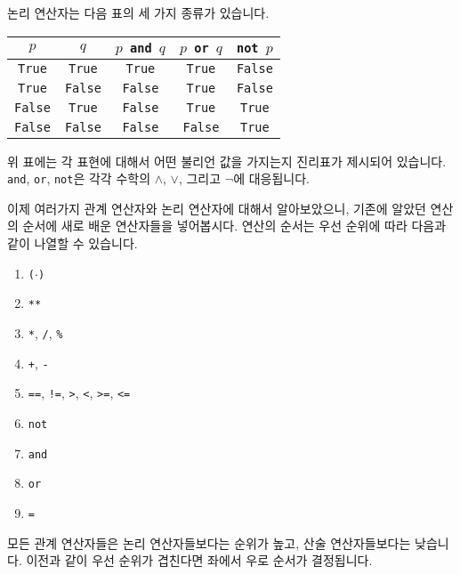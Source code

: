 \documentclass[../main.tex]{subfiles}
\begin{document}
논리 연산자는 다음 표의 세 가지 종류가 있습니다.
\begin{table}[H]
  \centering
  \begin{tabular}{c|c|c|c|c}
    $p$ & $q$ & \texttt{$p$ and $q$} & \texttt{$p$ or $q$} & \texttt{not $p$}\\ \hline
    \texttt{True} & \texttt{True} & \texttt{True} & \texttt{True} & \texttt{False}          \\
    \texttt{True} & \texttt{False} & \texttt{False} & \texttt{True} & \texttt{False}          \\
    \texttt{False} & \texttt{True} & \texttt{False} & \texttt{True} & \texttt{True}          \\
    \texttt{False} & \texttt{False} & \texttt{False} & \texttt{False} & \texttt{True}
  \end{tabular}
\end{table}
위 표에는 각 표현에 대해서 어떤 불리언 값을 가지는지 진리표가 제시되어 있습니다.
\texttt{and}, \texttt{or}, \texttt{not}은 각각 수학의 $\wedge$, $\vee$, 그리고 $\neg$에 대응됩니다.

이제 여러가지 관계 연산자와 논리 연산자에 대해서 알아보았으니, 기존에 알았던 연산의 순서에 새로 배운 연산자들을 넣어봅시다.
연산의 순서는 우선 순위에 따라 다음과 같이 나열할 수 있습니다.
\begin{enumerate}
  \item \texttt{($\cdot$)}
  \item \texttt{\texttt{**}}
  \item \texttt{*}, \texttt{/}, \texttt{\%}
  \item \texttt{+}, \texttt{-}
  \item \texttt{==}, \texttt{!=}, \texttt{>}, \texttt{<}, \texttt{>=}, \texttt{<=}
  \item \texttt{not}
  \item \texttt{and}
  \item \texttt{or}
  \item \texttt{=}
\end{enumerate}
모든 관계 연산자들은 논리 연산자들보다는 순위가 높고, 산술 연산자들보다는 낮습니다.
이전과 같이 우선 순위가 겹친다면 좌에서 우로 순서가 결정됩니다.
\end{document}
